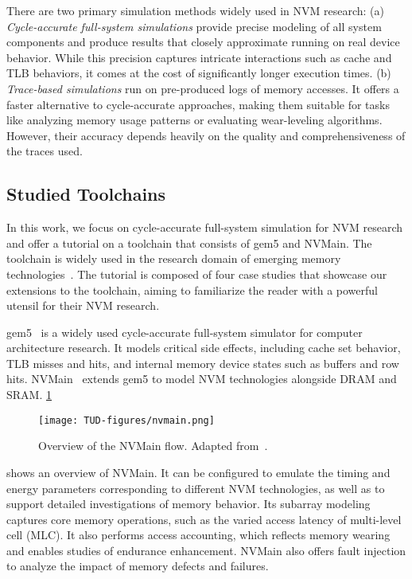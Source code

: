 \documentclass[manuscript,screen]{acmart}
\begin{document}
There are two primary simulation methods widely used in NVM research:
(a) \textit{Cycle-accurate full-system simulations} provide precise modeling of all system components and produce results that closely approximate running on real device behavior. While this precision captures intricate interactions such as cache and TLB behaviors, it comes at the cost of significantly longer execution times.
(b) \textit{Trace-based simulations} run on pre-produced logs of memory accesses.  It offers a faster alternative to cycle-accurate approaches, making them suitable for tasks like analyzing memory usage patterns or evaluating wear-leveling algorithms. However, their accuracy depends heavily on the quality and comprehensiveness of the traces used.


\subsection{Studied Toolchains}
\label{subsec:toolchain}
In this work, we focus on cycle-accurate full-system simulation for NVM research and offer a tutorial on a toolchain that consists of gem5 and NVMain. The toolchain is widely used in the research domain of emerging memory technologies~\cite{dwm-nvmain:19, hakert:2020:base, hakert:2022, hoelscher:2022, khan2019rtsim, khan2023downshift, asif:18, Wilbert:2024a, Wilbert:24b}. 
The tutorial is composed of four case studies that showcase our extensions to the toolchain, aiming to familiarize the reader with a powerful utensil for their NVM research.

gem5~\cite{binkert:2011} is a widely used cycle-accurate full-system simulator for computer architecture research. It models critical side effects, including cache set behavior, TLB misses and hits, and internal memory device states such as buffers and row hits.
NVMain~\cite{poremba:2015} extends gem5 to model NVM technologies alongside DRAM and SRAM. \cref{fig:nvmain}
\begin{figure}[t]
    \texttt{[image: TUD-figures/nvmain.png]}
    \caption{
        Overview of the NVMain flow. Adapted from~\cite{poremba:2015,khan2019rtsim}.
    }
    \label{fig:nvmain}
\end{figure}
shows an overview of NVMain.
It can be configured to emulate the timing and energy parameters corresponding to different NVM technologies, as well as to support detailed investigations of memory behavior.
Its subarray modeling captures core memory operations, such as the varied access latency of multi-level cell (MLC).  It also performs access accounting, which reflects memory wearing and enables studies of endurance enhancement.
NVMain also offers fault injection to analyze the impact of memory defects and failures.
\end{document}
